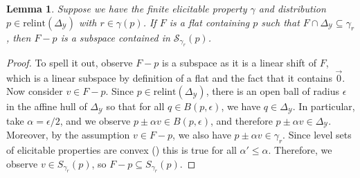 \documentclass{article}
\newcommand{\Comments}{1}
\newcommand{\mynote}[2]{\ifnum\Comments=1\textcolor{#1}{#2}\fi}
\newcommand{\raf}[1]{\mynote{green}{[RF: #1]}}
\newcommand{\simplex}{\Delta_\Y}
\newcommand{\relint}[1]{\mathrm{relint}(#1)}
\renewcommand{\S}{\mathcal{S}}
\newcommand{\Y}{\mathcal{Y}}
\newtheorem{lemma}{Lemma}
\begin{document}
\begin{lemma}\label{lem:feas-sub-is-a-flat}
	Suppose we have the finite elicitable property $\gamma$ and distribution $p \in \relint{\simplex}$ with $r \in \gamma(p)$.
	If $F$ is a flat containing $p$ such that $F \cap \simplex \subseteq \gamma_r$, then $F - p$ is a subspace contained in $\S_{\gamma_r}(p)$.
\end{lemma}
\begin{proof}
  To spell it out, observe $F-p$ is a subspace as it is a linear shift of $F$, which is a linear subspace by definition of a flat and the fact that it contains $\vec 0$.
  Now consider $v \in F - p$.
  Since $p \in \relint{\simplex}$, there is an open ball of radius $\epsilon$ in the affine hull of $\simplex$ so that for all $q \in B(p, \epsilon)$, we have $q \in \simplex$.
  In particular, take $\alpha = \epsilon / 2$, and we observe $p \pm \alpha v \in B(p, \epsilon)$, and therefore $p \pm \alpha v \in \simplex$.
  Moreover, by the assumption $v \in F - p$, we also have $p \pm \alpha v \in \gamma_r$. 
  Since level sets of elicitable properties are convex (\cite{lambert2009eliciting}) this is true for all $\alpha' \leq \alpha$.
  Therefore, we observe $v \in S_{\gamma_r}(p)$, so $F-p \subseteq S_{\gamma_r}(p)$.
%  
\end{proof}
\end{document}
